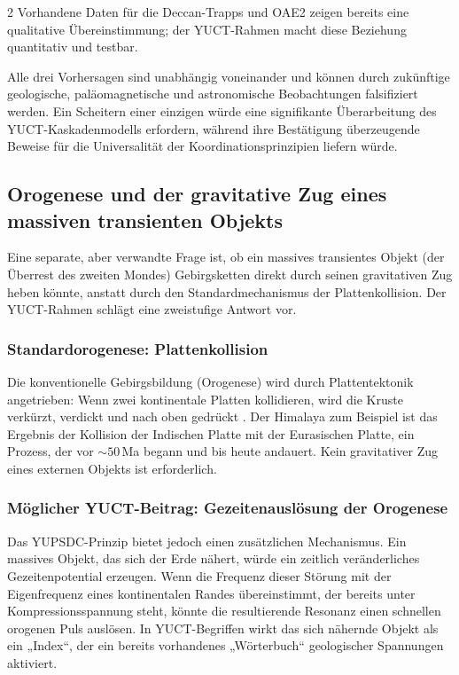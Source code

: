 \documentclass[11pt,a4paper]{article}
\begin{document}
\begin{multicols}{2}
		Vorhandene Daten für die Deccan-Trapps und OAE2 zeigen bereits eine qualitative
		Übereinstimmung; der YUCT-Rahmen macht diese Beziehung quantitativ und
		testbar.
		
		Alle drei Vorhersagen sind unabhängig voneinander und können durch zukünftige geologische, paläomagnetische und astronomische Beobachtungen falsifiziert werden. Ein Scheitern einer einzigen würde eine signifikante Überarbeitung des YUCT-Kaskadenmodells erfordern, während ihre Bestätigung überzeugende Beweise für die Universalität der Koordinationsprinzipien liefern würde.
		
		\subsection{Orogenese und der gravitative Zug eines massiven transienten Objekts}
		
		Eine separate, aber verwandte Frage ist, ob ein massives transientes Objekt
		(der Überrest des zweiten Mondes) Gebirgsketten direkt durch seinen gravitativen Zug heben könnte,
		anstatt durch den Standardmechanismus der Plattenkollision. Der YUCT-Rahmen schlägt eine zweistufige Antwort vor.
		
		\subsubsection{Standardorogenese: Plattenkollision}
		
		Die konventionelle Gebirgsbildung (Orogenese) wird durch Plattentektonik angetrieben:
		Wenn zwei kontinentale Platten kollidieren, wird die Kruste verkürzt, verdickt
		und nach oben gedrückt \cite{Kearey2013}. Der Himalaya zum Beispiel ist das Ergebnis der Kollision der Indischen Platte mit der Eurasischen Platte, ein Prozess, der vor \(\sim 50\) Ma begann und bis heute andauert. Kein gravitativer Zug eines externen Objekts ist erforderlich.
		
		\subsubsection{Möglicher YUCT-Beitrag: Gezeitenauslösung der Orogenese}
		
		Das YUPSDC-Prinzip bietet jedoch einen zusätzlichen Mechanismus. Ein massives Objekt,
		das sich der Erde nähert, würde ein zeitlich veränderliches Gezeitenpotential erzeugen.
		Wenn die Frequenz dieser Störung mit der Eigenfrequenz eines kontinentalen Randes übereinstimmt, der bereits unter Kompressionsspannung steht, könnte die resultierende Resonanz einen schnellen orogenen Puls auslösen. In YUCT-Begriffen wirkt das sich nähernde Objekt als ein „Index“, der ein bereits vorhandenes „Wörterbuch“ geologischer Spannungen aktiviert.
		

\end{multicols}
\end{document}
